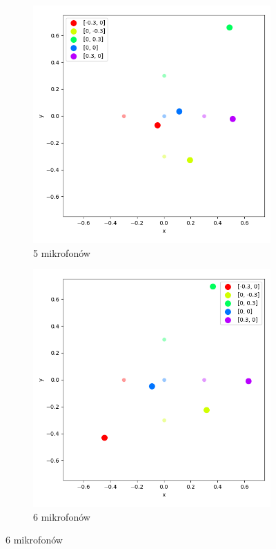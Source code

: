 \begin{figure}[H]
    \ContinuedFloat\centering
    \begin{subfigure}{.5\textwidth}
        \centering
        \includegraphics[width=\linewidth]{pics/mult_lat_2d_num/positions_5_mean.png}
        \caption{5 mikrofonów}
        \label{pic:2d_5_num_mult}
    \end{subfigure}%
    \begin{subfigure}{.5\textwidth}
        \centering
        \includegraphics[width=\linewidth]{pics/mult_lat_2d_num/positions_6_mean.png}
        \caption{6 mikrofonów}
        \label{pic:2d_6_num_mult}
    \end{subfigure}
\end{figure}
